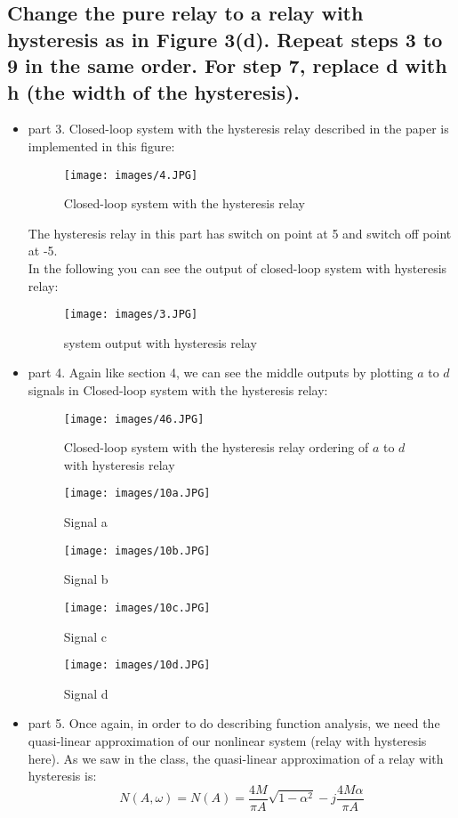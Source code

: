\documentclass[11pt]{scrartcl} %
\begin{document}
\subsection{Change the pure relay to a relay with hysteresis as in Figure 3(d). Repeat steps 3 to 9 in the same order. For step 7, replace d with h (the width of the hysteresis).}
\renewcommand{\labelitemi}{$\blacksquare$}
 \begin{itemize}
   \item  part 3. Closed-loop system with the hysteresis relay described in the paper is implemented in this figure:
\begin{figure}[H]
	\centering
	\texttt{[image: images/4.JPG]}
	\caption{Closed-loop system with the hysteresis relay}
\end{figure}
The hysteresis relay in this part has switch on point at 5 and switch off point at -5. \\
In the following you can see the output of closed-loop system with hysteresis relay:
\begin{figure}[H]
	\centering
	\texttt{[image: images/3.JPG]}
	\caption{system output with hysteresis relay}
\end{figure}
   \item  part 4. Again like section 4, we can see the middle outputs by plotting $a$ to $d$ signals in Closed-loop system with the hysteresis relay:

\begin{figure}[H]
	\centering
	\texttt{[image: images/46.JPG]}
	\caption{Closed-loop system with the hysteresis relay ordering of $a$ to $d$ with hysteresis relay}
\end{figure}
\begin{figure}[H]
	\centering
	\texttt{[image: images/10a.JPG]}
	\caption{Signal a}
\end{figure}
\begin{figure}[H]
	\centering
	\texttt{[image: images/10b.JPG]}
	\caption{Signal b}
\end{figure}
\begin{figure}[H]
	\centering
	\texttt{[image: images/10c.JPG]}
	\caption{Signal c}
\end{figure}
\begin{figure}[H]
	\centering
	\texttt{[image: images/10d.JPG]}
	\caption{Signal d}
\end{figure}
   \item part 5. Once again, in order to do describing function analysis, we need the quasi-linear approximation of our nonlinear system (relay with hysteresis here). As we saw in the class, the quasi-linear approximation of a relay with hysteresis is:
\begin{equation}
    N(A,\omega) = N(A) = \frac{4M}{\pi A} \sqrt{1-\alpha ^2} - j\frac{4M\alpha}{\pi A}
\end{equation}


\end{itemize}
\end{document}
